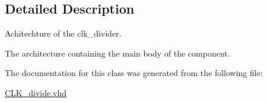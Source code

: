 \subsection{Detailed Description}
Achitechture of the clk\-\_\-divider. 

The architecture containing the main body of the component. 

The documentation for this class was generated from the following file\-:\begin{DoxyCompactItemize}
\item 
\hyperlink{CLK__divide_8vhd}{C\-L\-K\-\_\-divide.\-vhd}\end{DoxyCompactItemize}
